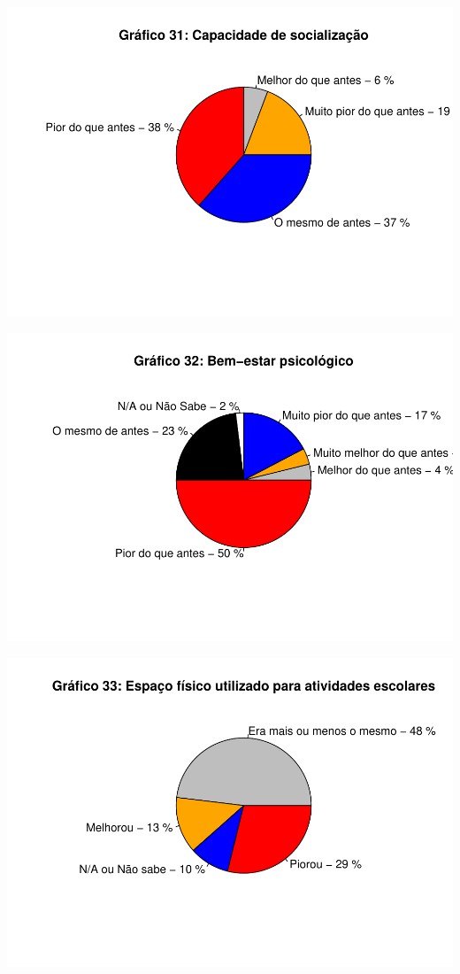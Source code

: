 \documentclass[
]{article}
\begin{document}
\includegraphics{consequencias-oriundas-da-pandemia-v1.0_files/figure-latex/grafico-xoxo-1.pdf}

\includegraphics{consequencias-oriundas-da-pandemia-v1.0_files/figure-latex/grafico-yoyo-1.pdf}

\includegraphics{consequencias-oriundas-da-pandemia-v1.0_files/figure-latex/grafico-zaza-1.pdf}
\end{document}
